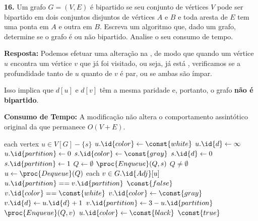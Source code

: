 
\noindent\textbf{16.} Um grafo $G = (V, E)$ é bipartido se seu conjunto de vértices $V$ pode ser bipartido em dois conjuntos disjuntos de vértices $A$ e $B$ e toda aresta de $E$ tem uma ponta em $A$ e outra em $B$. Escreva um algoritmo que, dado um grafo, determine se o grafo é ou não bipartido. Analise o seu consumo de tempo.

\textbf{Resposta:} Podemos efetuar uma alteração na , de modo que quando um vértice $u$ encontra um vértice $v$ que já foi visitado, ou seja, já está , verificamos se a profundidade tanto de $u$ quanto de $v$ é par, ou se ambas são ímpar.

Isso implica que $d[u]$ e $d[v]$ têm a mesma paridade e, portanto, o grafo \textbf{não é bipartido}.

\textbf{Consumo de Tempo:} A modificação não altera o comportamento assintótico original da  que permanece $O(V + E)$.

\begin{codebox}
\li \For each vertex $u \in V[G] - \{s\}$
\li \Do
        $u.\id{color} \gets \const{white}$
\li     $u.\id{d} \gets \infty$
\li     $u.\id{partition} \gets 0$
    \End
\li $s.\id{color} \gets \const{gray}$
\li $s.\id{d} \gets 0$
\li $s.\id{partition} \gets 1$
\li $Q \gets \emptyset$
\li $\proc{Enqueue}(Q, s)$
\li \While $Q \neq \emptyset$
\li \Do
        $u \gets \proc{Dequeue}(Q)$
\li     \For each $v \in G.\id{Adj}[u]$
\li     \Do
            \If $u.\id{partition} == v.\id{partition}$
\li         \Then
                \Return $\const{false}$
\li         \Else
\li             \If $v.\id{color} == \const{white}$
\li             \Then 
                    $v.\id{color} \gets \const{gray}$
\li                 $v.\id{d} \gets u.\id{d} + 1$
\li                 $v.\id{partition} \gets 3 - u.\id{partition}$
\li                 $\proc{Enqueue}(Q, v)$
                \End
            \End
        \End
\li     $u.\id{color} \gets \const{black}$
    \End
\li \Return $\const{true}$
\end{codebox}
